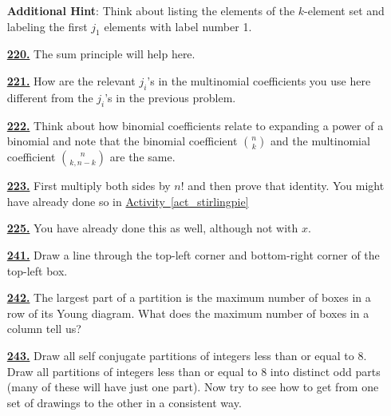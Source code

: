 \documentclass[10pt,]{book}
\theoremstyle{plain}
\theoremstyle{definition}
\theoremstyle{definition}
\theoremstyle{definition}
\numberwithin{equation}{chapter}
\begin{document}
\begin{itemize}[itemsep=1em]
\par\smallskip
\noindent\textbf{Additional Hint}: \hypertarget{p-1019}{}%
Think about listing the elements of the \(k\)-element set and labeling the first \(j_1\) elements with label number 1.%

\hypertarget{a-220}{}\item[\textbf{\hyperref[activity-220]{220.}}]
\hypertarget{p-1022}{}%
The sum principle will help here.%

\hypertarget{a-221}{}\item[\textbf{\hyperref[activity-221]{221.}}]
\hypertarget{p-1025}{}%
How are the relevant \(j_i\)'s in the multinomial coefficients you use here different from the \(j_i\)'s in the previous problem.%

\hypertarget{a-222}{}\item[\textbf{\hyperref[activity-222]{222.}}]
\hypertarget{p-1028}{}%
Think about how binomial coefficients relate to expanding a power of a binomial and note that the binomial coefficient \(\binom{n}{k}\) and the multinomial coefficient \(\binom{n}{k,n-k}\) are the same.%

\hypertarget{a-223}{}\item[\textbf{\hyperref[activity-223]{223.}}]
\hypertarget{p-1033}{}%
First multiply both sides by \(n!\) and then prove that identity.  You might have already done so in \hyperref[act_stirlingpie]{Activity~\ref{act_stirlingpie}}%

\hypertarget{a-225}{}\item[\textbf{\hyperref[activity-225]{225.}}]
\hypertarget{p-1042}{}%
You have already done this as well, although not with \(x\).%

\hypertarget{a-241}{}\item[\textbf{\hyperref[activity-241]{241.}}]
\hypertarget{p-1091}{}%
Draw a line through the top-left corner and bottom-right corner of the top-left box.%

\hypertarget{a-242}{}\item[\textbf{\hyperref[activity-242]{242.}}]
\hypertarget{p-1095}{}%
The largest part of a partition is the maximum number of boxes in a row of its Young diagram. What does the maximum number of boxes in a column tell us?%

\hypertarget{a-243}{}\item[\textbf{\hyperref[activity-243]{243.}}]
\hypertarget{p-1098}{}%
Draw all self conjugate partitions of integers less than or equal to 8.  Draw all partitions of integers less than or equal to 8 into distinct odd parts (many of these will have just one part). Now try to see how to get from one set of drawings to the other in a consistent way.%


\end{itemize}
\end{document}
